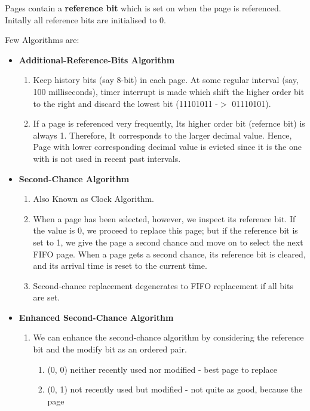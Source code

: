 \documentclass[12pt,onecolumn]{IEEEtran}
\begin{document}
Pages contain a \textbf{reference bit} which is set on when the page is referenced. Initally all reference bits are initialised to 0.

Few Algorithms are:
\begin{itemize}
	\item \textbf{Additional-Reference-Bits Algorithm}
	\begin{enumerate}
		\item Keep history bits (say 8-bit) in each page. At some regular interval (say, 100 milliseconds), timer interrupt is made which shift the higher order bit to the right and discard the lowest bit (11101011 -$>$ 01110101). 
		\item If a page is referenced very frequently, Its higher order bit (refernce bit) is always 1. Therefore, It corresponds to the larger decimal value. Hence, Page with lower corresponding decimal value is evicted since it is the one with is not used in recent past intervals.
	\end{enumerate}
	\item \textbf{Second-Chance Algorithm}
	\begin{enumerate}
		\item Also Known as Clock Algorithm.
		\item When a page has been selected, however, we inspect its reference bit. If the value is 0, we proceed to replace this page; but if the reference bit is set to
		1, we give the page a second chance and move on to select the next FIFO page.
		When a page gets a second chance, its reference bit is cleared, and its arrival
		time is reset to the current time.
		\item Second-chance replacement degenerates to FIFO replacement if all bits are set.
		\begin{center}
		\end{center}
	\end{enumerate}
	\item \textbf{Enhanced Second-Chance Algorithm}
	\begin{enumerate}
		\item We can enhance the second-chance algorithm by considering the reference bit
		and the modify bit as an ordered pair.
		\begin{enumerate}
			\item (0, 0) neither recently used nor modified - best page to replace
			\item (0, 1) not recently used but modified - not quite as good, because the page

\end{enumerate}
\end{enumerate}
\end{itemize}
\end{document}
